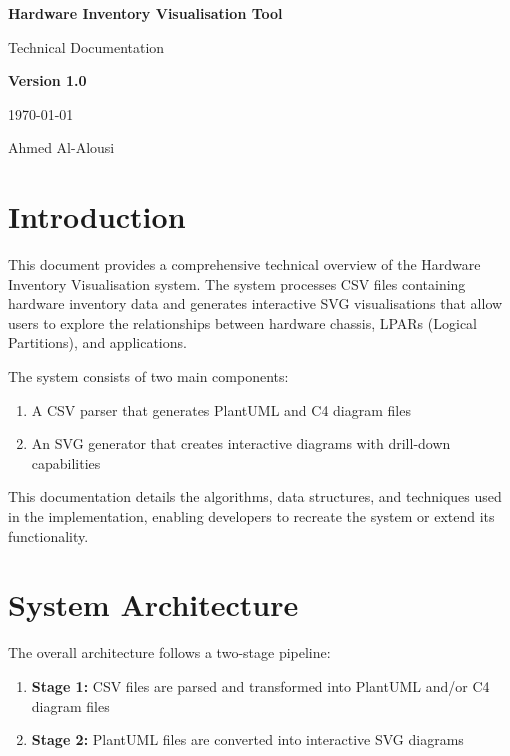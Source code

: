 \documentclass[a4paper,12pt]{article}
\begin{document}
\begin{titlepage}
    \centering
    \vspace*{2cm}
    {\Huge\textbf{Hardware Inventory Visualisation Tool}\par}
    \vspace{0.5cm}
    {\Large Technical Documentation\par}
    \vspace{1cm}
    {\large\textbf{Version 1.0}\par}
    \vspace{0.5cm}
    {\large\today\par}
    \vfill
    {\large Ahmed Al-Alousi\par}
    \vspace{2cm}
\end{titlepage}


\thispagestyle{empty}

\newpage
\tableofcontents
\newpage

\section{Introduction}

This document provides a comprehensive technical overview of the Hardware Inventory Visualisation system. The system processes CSV files containing hardware inventory data and generates interactive SVG visualisations that allow users to explore the relationships between hardware chassis, LPARs (Logical Partitions), and applications.

The system consists of two main components:
\begin{enumerate}
    \item A CSV parser that generates PlantUML and C4 diagram files
    \item An SVG generator that creates interactive diagrams with drill-down capabilities
\end{enumerate}

This documentation details the algorithms, data structures, and techniques used in the implementation, enabling developers to recreate the system or extend its functionality.

\section{System Architecture}

The overall architecture follows a two-stage pipeline:

\begin{enumerate}
    \item \textbf{Stage 1:} CSV files are parsed and transformed into PlantUML and/or C4 diagram files
    \item \textbf{Stage 2:} PlantUML files are converted into interactive SVG diagrams
\end{enumerate}
\end{document}
